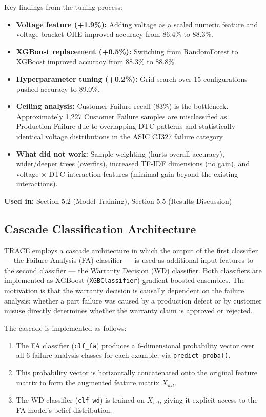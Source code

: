 \documentclass[10pt]{article}
\begin{document}
Key findings from the tuning process:

\begin{itemize}
    \item \textbf{Voltage feature (+1.9\%):} Adding voltage as a scaled numeric feature and voltage-bracket OHE improved accuracy from 86.4\% to 88.3\%.
    \item \textbf{XGBoost replacement (+0.5\%):} Switching from RandomForest to XGBoost improved accuracy from 88.3\% to 88.8\%.
    \item \textbf{Hyperparameter tuning (+0.2\%):} Grid search over 15 configurations pushed accuracy to 89.0\%.
    \item \textbf{Ceiling analysis:} Customer Failure recall (83\%) is the bottleneck. Approximately 1{,}227 Customer Failure samples are misclassified as Production Failure due to overlapping DTC patterns and statistically identical voltage distributions in the ASIC CJ327 failure category.
    \item \textbf{What did not work:} Sample weighting (hurts overall accuracy), wider/deeper trees (overfits), increased TF-IDF dimensions (no gain), and voltage $\times$ DTC interaction features (minimal gain beyond the existing interactions).
\end{itemize}

\textbf{Used in:} Section 5.2 (Model Training), Section 5.5 (Results Discussion)

\subsection{Cascade Classification Architecture}

TRACE employs a cascade architecture in which the output of the first classifier --- the Failure Analysis (FA) classifier --- is used as additional input features to the second classifier --- the Warranty Decision (WD) classifier. Both classifiers are implemented as XGBoost (\texttt{XGBClassifier}) gradient-boosted ensembles. The motivation is that the warranty decision is causally dependent on the failure analysis: whether a part failure was caused by a production defect or by customer misuse directly determines whether the warranty claim is approved or rejected.

The cascade is implemented as follows:

\begin{enumerate}
    \item The FA classifier (\texttt{clf\_fa}) produces a 6-dimensional probability vector over all 6 failure analysis classes for each example, via \texttt{predict\_proba()}.
    \item This probability vector is horizontally concatenated onto the original feature matrix to form the augmented feature matrix \(X_{wd}\).
    \item The WD classifier (\texttt{clf\_wd}) is trained on \(X_{wd}\), giving it explicit access to the FA model's belief distribution.
\end{enumerate}
\end{document}
